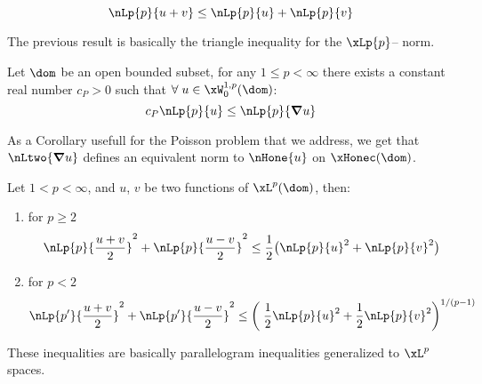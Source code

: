 \medskip
\begin{lmm}[Minkowski]\label{lm:minkowski}
\begin{equation*}
\nLp{p}{u + v} \leq \nLp{p}{u} + \nLp{p}{v}
\end{equation*}
\end{lmm}

\begin{rmrk}
The previous result is basically the triangle inequality for the $\xLp{p}$--
norm.
\end{rmrk}

\medskip
\begin{lmm}[Poincaré]\label{lm:poincare}
Let $\dom$ be an open bounded subset, for any $1 \leq p < \infty$ there exists a constant real number $c_P > 0$ such that $\forany u \in \xW^{1,p}_0(\dom)$:
\begin{equation*}
c_P \nLp{p}{u} \leq \nLp{p}{\Grad u}
\end{equation*}
\end{lmm}

\begin{rmrk}
As a Corollary usefull for the Poisson problem that we address, we get that $\nLtwo{\Grad u}$ defines an equivalent norm to $\nHone{u}$ on $\xHonec(\dom)$.
\end{rmrk}

\medskip
\begin{lmm}[Clarkson]\label{lm:clarkson}
Let $1 < p < \infty$, and $u$, $v$ be two functions of $\xL^p(\dom)$, then:
\begin{enumerate}
\item for $p \geq 2$
\begin{equation*}
\nLp{p}{\dfrac{u + v}{2}}^2 + \nLp{p}{\dfrac{u - v}{2}}^2 \leq \dfrac{1}{2}\bigl(\nLp{p}{u}^2 + \nLp{p}{v}^2\bigr)
\end{equation*}
\item for $p < 2$
\begin{equation*}
\nLp{p'}{\dfrac{u + v}{2}}^2 +\nLp{p'}{\dfrac{u - v}{2}}^2 \leq \left(\;\dfrac{1}{2}\nLp{p}{u}^2 + \dfrac{1}{2}\nLp{p}{v}^2\right)^{1/(p-1)}
\end{equation*}
\end{enumerate}
\end{lmm}

\begin{rmrk}
These inequalities are basically parallelogram inequalities generalized to $\xL^p$ spaces.
\end{rmrk}
